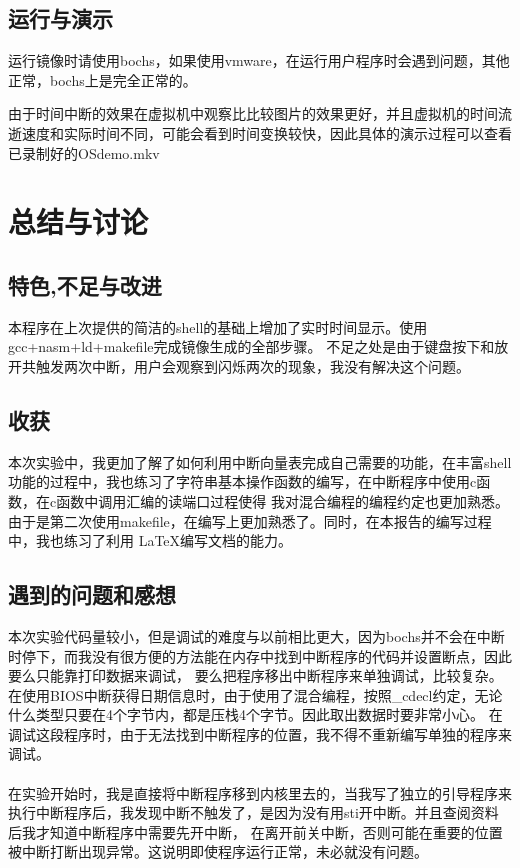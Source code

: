 \documentclass[a4paper, 11pt]{article} %
\begin{document}
\subsection{运行与演示}

运行镜像时请使用bochs，如果使用vmware，在运行用户程序时会遇到问题，其他正常，bochs上是完全正常的。


由于时间中断的效果在虚拟机中观察比比较图片的效果更好，并且虚拟机的时间流逝速度和实际时间不同，可能会看到时间变换较快，因此具体的演示过程可以查看已录制好的OSdemo.mkv

\section{总结与讨论}



\subsection{特色,不足与改进}

本程序在上次提供的简洁的shell的基础上增加了实时时间显示。使用gcc+nasm+ld+makefile完成镜像生成的全部步骤。
不足之处是由于键盘按下和放开共触发两次中断，用户会观察到闪烁两次的现象，我没有解决这个问题。

\subsection{收获}

本次实验中，我更加了解了如何利用中断向量表完成自己需要的功能，在丰富shell功能的过程中，我也练习了字符串基本操作函数的编写，在中断程序中使用c函数，在c函数中调用汇编的读端口过程使得
我对混合编程的编程约定也更加熟悉。由于是第二次使用makefile，在编写上更加熟悉了\cite{makefile}。同时，在本报告的编写过程中，我也练习了利用 \LaTeX 编写文档的能力。\cite{lamport94, cite}

\subsection{遇到的问题和感想}
本次实验代码量较小，但是调试的难度与以前相比更大，因为bochs并不会在中断时停下，而我没有很方便的方法能在内存中找到中断程序的代码并设置断点，因此要么只能靠打印数据来调试，
要么把程序移出中断程序来单独调试，比较复杂。在使用BIOS中断获得日期信息时，由于使用了混合编程，按照\_cdecl约定，无论什么类型只要在4个字节内，都是压栈4个字节。因此取出数据时要非常小心。
在调试这段程序时，由于无法找到中断程序的位置，我不得不重新编写单独的程序来调试。
\paragraph{}
在实验开始时，我是直接将中断程序移到内核里去的，当我写了独立的引导程序来执行中断程序后，我发现中断不触发了，是因为没有用sti开中断。并且查阅资料后我才知道中断程序中需要先开中断，
在离开前关中断，否则可能在重要的位置被中断打断出现异常。这说明即使程序运行正常，未必就没有问题。
\end{document}
